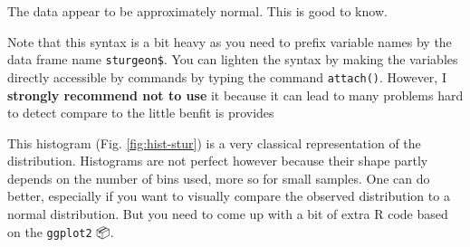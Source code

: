 \documentclass[
  12pt,
]{book}
\makeatletter
\newenvironment{Shaded}{\begin{snugshade}}{\end{snugshade}}
\newcommand{\CommentTok}[1]{\textcolor[rgb]{0.56,0.35,0.01}{\textit{#1}}}
\newcommand{\DataTypeTok}[1]{\textcolor[rgb]{0.13,0.29,0.53}{#1}}
\newcommand{\DecValTok}[1]{\textcolor[rgb]{0.00,0.00,0.81}{#1}}
\newcommand{\FloatTok}[1]{\textcolor[rgb]{0.00,0.00,0.81}{#1}}
\newcommand{\KeywordTok}[1]{\textcolor[rgb]{0.13,0.29,0.53}{\textbf{#1}}}
\newcommand{\NormalTok}[1]{#1}
\newcommand{\OperatorTok}[1]{\textcolor[rgb]{0.81,0.36,0.00}{\textbf{#1}}}
\newcommand{\StringTok}[1]{\textcolor[rgb]{0.31,0.60,0.02}{#1}}
\newenvironment{kframe}{%
\medskip{}
\setlength{\fboxsep}{.8em}
\def\at@end@of@kframe{}%
\ifinner\ifhmode%
 \def\at@end@of@kframe{\end{minipage}}%
 \begin{minipage}{\columnwidth}%
\fi\fi%
\def\FrameCommand##1{\hskip\@totalleftmargin \hskip-\fboxsep
\colorbox{incolor}{##1}\hskip-\fboxsep
    \hskip-\linewidth \hskip-\@totalleftmargin \hskip\columnwidth}%
\MakeFramed {\advance\hsize-\width
  \@totalleftmargin\z@ \linewidth\hsize
  \@setminipage}}%
{\par\unskip\endMakeFramed%
\at@end@of@kframe}
\newenvironment{rmdblock}[1]
 {
 \begin{itemize}
 \renewcommand{\labelitemi}{
   \raisebox{-.7\height}[0pt][0pt]{
     {\setkeys{Gin}{width=3em,keepaspectratio}\texttt{[image: images/\#1]}}
   }
 }
 \begin{kframe}
 \setlength{\fboxsep}{1em}
 \item
 }
 {
 \end{kframe}
 \end{itemize}
 }
\newenvironment{rmdnote}
  {\begin{rmdblock}{note}}
  {\end{rmdblock}}
\makeatother
\begin{document}
The data appear to be approximately normal. This is good to know.

\begin{rmdnote}
Note that this syntax is a bit heavy as you need to prefix variable names by the data frame name \texttt{sturgeon\$}. You can lighten the syntax by making the variables directly accessible by commands by typing the command \texttt{attach()}.
However, I \textbf{strongly recommend not to use} it because it can lead to many problems hard to detect compare to the little benfit is provides
\end{rmdnote}

This histogram (Fig. \ref{fig:hist-stur}) is a very classical representation of the distribution. Histograms are not perfect however because their shape partly depends on the number of bins used, more so for small samples. One can do better, especially if you want to visually compare the observed distribution to a normal distribution. But you need to come up with a bit of extra R code based on the \texttt{ggplot2} 📦.

\begin{Shaded}
\end{Shaded}
\end{document}
